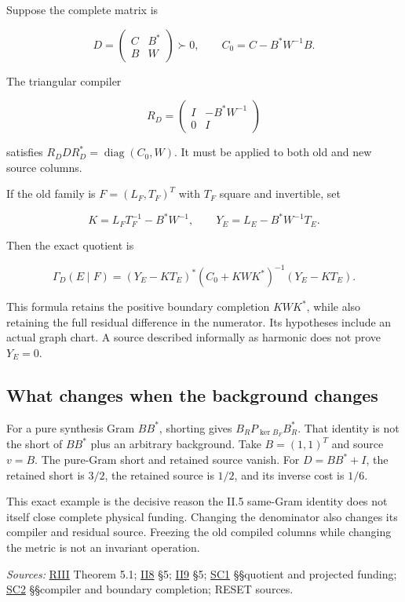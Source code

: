 \documentclass[
  10pt,
  a4paper,
  10pt,
  oneside,
  openany]{book}
\begin{document}
Suppose the complete matrix is

\[
D=\begin{pmatrix}C&B^*\\B&W\end{pmatrix}\succ0,
\qquad C_0=C-B^*W^{-1}B.
\tag{7.15}\label{eq:7.15}
\]

The triangular compiler

\[
R_D=\begin{pmatrix}I&-B^*W^{-1}\\0&I\end{pmatrix}
\tag{7.16}\label{eq:7.16}
\]

satisfies \(R_DDR_D^*=\operatorname{diag}(C_0,W)\). It must be applied
to both old and new source columns.

If the old family is \(F=(L_F,T_F)^T\) with \(T_F\) square and
invertible, set

\[
K=L_FT_F^{-1}-B^*W^{-1},
\qquad Y_E=L_E-B^*W^{-1}T_E.
\tag{7.17}\label{eq:7.17}
\]

Then the exact quotient is

\[
\Gamma_D(E\mid F)
=(Y_E-KT_E)^*(C_0+KWK^*)^{-1}(Y_E-KT_E).
\tag{7.18}\label{eq:7.18}
\]

This formula retains the positive boundary completion \(KWK^*\), while
also retaining the full residual difference in the numerator. Its
hypotheses include an actual graph chart. A source described informally
as harmonic does not prove \(Y_E=0\).

\subsection{What changes when the background
changes}\label{what-changes-when-the-background-changes}

For a pure synthesis Gram \(BB^*\), shorting gives
\(B_RP_{\ker B_F}B_R^*\). That identity is not the short of \(BB^*\)
plus an arbitrary background. Take \(B=(1,1)^T\) and source \(v=B\). The
pure-Gram short and retained source vanish. For \(D=BB^*+I\), the
retained short is \(3/2\), the retained source is \(1/2\), and its
inverse cost is \(1/6\).

This exact example is the decisive reason the II.5 same-Gram identity
does not itself close complete physical funding. Changing the
denominator also changes its compiler and residual source. Freezing the
old compiled columns while changing the metric is not an invariant
operation.

\emph{Sources:} \hyperref[source-riii]{RIII} Theorem 5.1;
\hyperref[source-ii8]{II8} §5; \hyperref[source-ii9]{II9} §5;
\hyperref[source-sc1]{SC1} §§quotient and projected funding;
\hyperref[source-sc2]{SC2} §§compiler and boundary completion; RESET
sources.
\end{document}
